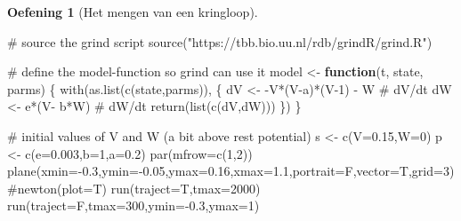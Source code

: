 \documentclass[
  a4paper,
]{scrbook}
\newenvironment{Shaded}{\begin{snugshade}}{\end{snugshade}}
\newcommand{\AttributeTok}[1]{\textcolor[rgb]{0.40,0.45,0.13}{#1}}
\newcommand{\CommentTok}[1]{\textcolor[rgb]{0.37,0.37,0.37}{#1}}
\newcommand{\ControlFlowTok}[1]{\textcolor[rgb]{0.00,0.23,0.31}{\textbf{#1}}}
\newcommand{\DecValTok}[1]{\textcolor[rgb]{0.68,0.00,0.00}{#1}}
\newcommand{\FloatTok}[1]{\textcolor[rgb]{0.68,0.00,0.00}{#1}}
\newcommand{\FunctionTok}[1]{\textcolor[rgb]{0.28,0.35,0.67}{#1}}
\newcommand{\NormalTok}[1]{\textcolor[rgb]{0.00,0.23,0.31}{#1}}
\newcommand{\OtherTok}[1]{\textcolor[rgb]{0.00,0.23,0.31}{#1}}
\newcommand{\SpecialCharTok}[1]{\textcolor[rgb]{0.37,0.37,0.37}{#1}}
\newcommand{\StringTok}[1]{\textcolor[rgb]{0.13,0.47,0.30}{#1}}
\theoremstyle{definition}
\newtheorem{exercise}{Oefening}[chapter]
\theoremstyle{remark}
\begin{document}
\begin{exercise}[Het mengen van een
kringloop]
\begin{Shaded}
\begin{Highlighting}[]
\CommentTok{\# source the grind script}
\FunctionTok{source}\NormalTok{(}\StringTok{"https://tbb.bio.uu.nl/rdb/grindR/grind.R"}\NormalTok{)}

\CommentTok{\# define the model{-}function so grind can use it}
\NormalTok{model }\OtherTok{\textless{}{-}} \ControlFlowTok{function}\NormalTok{(t, state, parms) \{}
  \FunctionTok{with}\NormalTok{(}\FunctionTok{as.list}\NormalTok{(}\FunctionTok{c}\NormalTok{(state,parms)), \{}
\NormalTok{    dV }\OtherTok{\textless{}{-}} \SpecialCharTok{{-}}\NormalTok{V}\SpecialCharTok{*}\NormalTok{(V}\SpecialCharTok{{-}}\NormalTok{a)}\SpecialCharTok{*}\NormalTok{(V}\DecValTok{{-}1}\NormalTok{) }\SpecialCharTok{{-}}\NormalTok{ W  }\CommentTok{\# dV/dt}
\NormalTok{    dW }\OtherTok{\textless{}{-}}\NormalTok{ e}\SpecialCharTok{*}\NormalTok{(V}\SpecialCharTok{{-}}\NormalTok{ b}\SpecialCharTok{*}\NormalTok{W)         }\CommentTok{\# dW/dt }
    \FunctionTok{return}\NormalTok{(}\FunctionTok{list}\NormalTok{(}\FunctionTok{c}\NormalTok{(dV,dW)))  }
\NormalTok{  \}) }
\NormalTok{\}}

\CommentTok{\# initial values of V and W (a bit above rest potential)}
\NormalTok{s }\OtherTok{\textless{}{-}} \FunctionTok{c}\NormalTok{(}\AttributeTok{V=}\FloatTok{0.15}\NormalTok{,}\AttributeTok{W=}\DecValTok{0}\NormalTok{)         }
\NormalTok{p }\OtherTok{\textless{}{-}} \FunctionTok{c}\NormalTok{(}\AttributeTok{e=}\FloatTok{0.003}\NormalTok{,}\AttributeTok{b=}\DecValTok{1}\NormalTok{,}\AttributeTok{a=}\FloatTok{0.2}\NormalTok{)}
\FunctionTok{par}\NormalTok{(}\AttributeTok{mfrow=}\FunctionTok{c}\NormalTok{(}\DecValTok{1}\NormalTok{,}\DecValTok{2}\NormalTok{))}
\FunctionTok{plane}\NormalTok{(}\AttributeTok{xmin=}\SpecialCharTok{{-}}\FloatTok{0.3}\NormalTok{,}\AttributeTok{ymin=}\SpecialCharTok{{-}}\FloatTok{0.05}\NormalTok{,}\AttributeTok{ymax=}\FloatTok{0.16}\NormalTok{,}\AttributeTok{xmax=}\FloatTok{1.1}\NormalTok{,}\AttributeTok{portrait=}\NormalTok{F,}\AttributeTok{vector=}\NormalTok{T,}\AttributeTok{grid=}\DecValTok{3}\NormalTok{)}
\CommentTok{\#newton(plot=T)}
\FunctionTok{run}\NormalTok{(}\AttributeTok{traject=}\NormalTok{T,}\AttributeTok{tmax=}\DecValTok{2000}\NormalTok{)}
\FunctionTok{run}\NormalTok{(}\AttributeTok{traject=}\NormalTok{F,}\AttributeTok{tmax=}\DecValTok{300}\NormalTok{,}\AttributeTok{ymin=}\SpecialCharTok{{-}}\FloatTok{0.3}\NormalTok{,}\AttributeTok{ymax=}\DecValTok{1}\NormalTok{)}


\end{Highlighting}
\end{Shaded}
\end{exercise}
\end{document}

